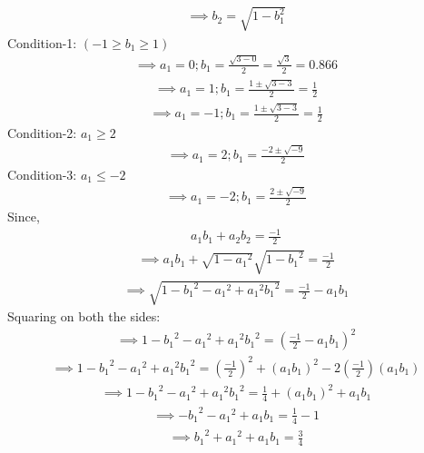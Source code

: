 \documentclass[12pt,-letter paper]{article}
\providecommand{\brak}[1]{\ensuremath{\left(#1\right)}}
\providecommand{\brak}[1]{\ensuremath{\left(#1\right)}}
\begin{document}
\begin{enumerate}
\begin{align}
 \implies     b_2 = \sqrt{1-b_1^2}
 \label{eq:eq6}
     \end{align}
      Condition-1:  $(-1 \geq b_1 \geq 1)$
     \begin{align}
     \implies a_1=0;   b_1=\frac{\sqrt{3-0}}{2}=\frac{\sqrt{3}}{2}=0.866
     \end{align}
      \begin{align}
     \implies a_1=1;   b_1=\frac{1 \pm\sqrt{3-3}}{2}=\frac{1}{2}
     \end{align}
     \begin{align}
     \implies a_1=-1;   b_1=\frac{1 \pm\sqrt{3-3}}{2}=\frac{1}{2}
     \end{align}
        Condition-2: $a_1 \geq 2$
         \begin{align}
     \implies a_1=2;    b_1=\frac{-2 \pm\sqrt{-9}}{2}
     \end{align}
     Condition-3: $a_1 \leq -2$
         \begin{align}
     \implies a_1=-2;  b_1=\frac{2 \pm\sqrt{-9}}{2}
     \end{align}
Since, 
\begin{align}
 {a_1}{b_1} + {a_2}{b_2} = \frac{-1}{2}
\end{align}
\begin{align}
\implies {a_1}{b_1} + \sqrt{1-{a_1}^2} \sqrt{1-{b_1}^2}  = \frac{-1}{2}
\end{align}
\begin{align}
\implies  \sqrt{{1-{b_1}^2-{a_1}^2+{a_1}^2{b_1}^2}} =  \frac{-1}{2}- {a_1}{b_1} 
\end{align}
Squaring on both the sides:
\begin{align}
\implies  {1-{b_1}^2-{a_1}^2+{a_1}^2{b_1}^2} =  \brak{\frac{-1}{2}- {a_1}{b_1}}^2
    \end{align}
    \begin{align}
\implies {1-{b_1}^2-{a_1}^2+{a_1}^2{b_1}^2} = \brak{\frac{-1}{2}}^2 + (a_1b_1)^2 - 2\brak{\frac{-1}{2}}(a_1b_1)
    \end{align}
    \begin{align}
 \implies   {1-{b_1}^2-{a_1}^2+{a_1}^2{b_1}^2} = \frac{1}{4} +(a_1b_1)^2+a_1b_1
    \end{align}
    \begin{align}
   \implies -{b_1}^2-{a_1}^2+{a_1b_1} = \frac{1}{4}-1
    \end{align}
  \begin{align}
  \implies {b_1}^2+{a_1}^2+{a_1b_1}=\frac{3}{4}
  \end{align}

\end{enumerate}
\end{document}
